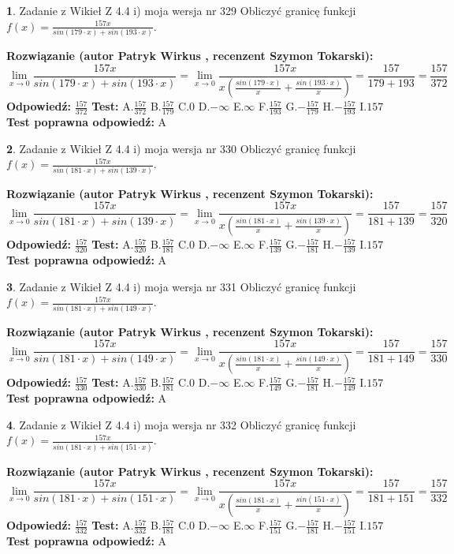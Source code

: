 \documentclass[12pt, a4paper]{article}
\theoremstyle{definition} %
\newtheorem{zad}{}
\newcommand{\zadStart}[1]{\begin{zad}#1\newline}
\newcommand{\zadStop}{\end{zad}}
\newcommand{\rozwStart}[2]{\noindent \textbf{Rozwiązanie (autor #1 , recenzent #2): }\newline}
\newcommand{\rozwStop}{\newline}
\newcommand{\odpStart}{\noindent \textbf{Odpowiedź:}\newline}
\newcommand{\odpStop}{\newline}
\newcommand{\testStart}{\noindent \textbf{Test:}\newline}
\newcommand{\testStop}{\newline}
\newcommand{\kluczStart}{\noindent \textbf{Test poprawna odpowiedź:}\newline}
\newcommand{\kluczStop}{\newline}
\begin{document}
\zadStart{Zadanie z Wikieł Z 4.4 i) moja wersja nr 329}
Obliczyć granicę funkcji $f(x)=\frac{157x}{sin(179\cdot x) +sin(193\cdot x)}$.
\zadStop
\rozwStart{Patryk Wirkus}{Szymon Tokarski}
$$\lim\limits_{x\to 0}\frac{157x}{sin(179\cdot x) +sin(193\cdot x)}=\lim\limits_{x\to 0}\frac{157x}{x(\frac{sin(179\cdot x)}{x}+\frac{sin(193\cdot x)}{x})}=\frac{157}{179+193} = \frac{157}{372}$$
\rozwStop
\odpStart
$\frac{157}{372}$
\odpStop
\testStart
A.$\frac{157}{372}$
B.$\frac{157}{179}$
C.$0$
D.$-\infty$
E.$\infty$
F.$\frac{157}{193}$
G.$-\frac{157}{179}$
H.$-\frac{157}{193}$
I.$157$
\testStop
\kluczStart
A
\kluczStop



\zadStart{Zadanie z Wikieł Z 4.4 i) moja wersja nr 330}
Obliczyć granicę funkcji $f(x)=\frac{157x}{sin(181\cdot x) +sin(139\cdot x)}$.
\zadStop
\rozwStart{Patryk Wirkus}{Szymon Tokarski}
$$\lim\limits_{x\to 0}\frac{157x}{sin(181\cdot x) +sin(139\cdot x)}=\lim\limits_{x\to 0}\frac{157x}{x(\frac{sin(181\cdot x)}{x}+\frac{sin(139\cdot x)}{x})}=\frac{157}{181+139} = \frac{157}{320}$$
\rozwStop
\odpStart
$\frac{157}{320}$
\odpStop
\testStart
A.$\frac{157}{320}$
B.$\frac{157}{181}$
C.$0$
D.$-\infty$
E.$\infty$
F.$\frac{157}{139}$
G.$-\frac{157}{181}$
H.$-\frac{157}{139}$
I.$157$
\testStop
\kluczStart
A
\kluczStop



\zadStart{Zadanie z Wikieł Z 4.4 i) moja wersja nr 331}
Obliczyć granicę funkcji $f(x)=\frac{157x}{sin(181\cdot x) +sin(149\cdot x)}$.
\zadStop
\rozwStart{Patryk Wirkus}{Szymon Tokarski}
$$\lim\limits_{x\to 0}\frac{157x}{sin(181\cdot x) +sin(149\cdot x)}=\lim\limits_{x\to 0}\frac{157x}{x(\frac{sin(181\cdot x)}{x}+\frac{sin(149\cdot x)}{x})}=\frac{157}{181+149} = \frac{157}{330}$$
\rozwStop
\odpStart
$\frac{157}{330}$
\odpStop
\testStart
A.$\frac{157}{330}$
B.$\frac{157}{181}$
C.$0$
D.$-\infty$
E.$\infty$
F.$\frac{157}{149}$
G.$-\frac{157}{181}$
H.$-\frac{157}{149}$
I.$157$
\testStop
\kluczStart
A
\kluczStop



\zadStart{Zadanie z Wikieł Z 4.4 i) moja wersja nr 332}
Obliczyć granicę funkcji $f(x)=\frac{157x}{sin(181\cdot x) +sin(151\cdot x)}$.
\zadStop
\rozwStart{Patryk Wirkus}{Szymon Tokarski}
$$\lim\limits_{x\to 0}\frac{157x}{sin(181\cdot x) +sin(151\cdot x)}=\lim\limits_{x\to 0}\frac{157x}{x(\frac{sin(181\cdot x)}{x}+\frac{sin(151\cdot x)}{x})}=\frac{157}{181+151} = \frac{157}{332}$$
\rozwStop
\odpStart
$\frac{157}{332}$
\odpStop
\testStart
A.$\frac{157}{332}$
B.$\frac{157}{181}$
C.$0$
D.$-\infty$
E.$\infty$
F.$\frac{157}{151}$
G.$-\frac{157}{181}$
H.$-\frac{157}{151}$
I.$157$
\testStop
\kluczStart
A
\kluczStop
\end{document}
